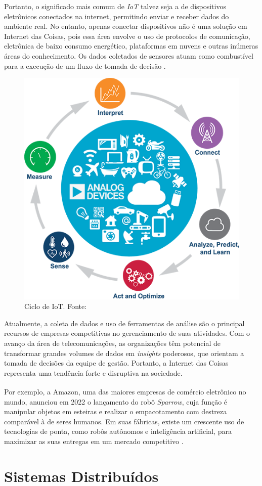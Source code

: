 Portanto, o significado mais comum de \textit{IoT} talvez seja a de dispositivos eletrônicos conectados na internet, permitindo enviar e receber dados do ambiente real. No entanto, apenas conectar dispositivos não é uma solução em Internet das Coisas, pois essa área envolve o uso de protocolos de comunicação, eletrônica de baixo consumo energético, plataformas em nuvens e outras inúmeras áreas do conhecimento. Os dados coletados de sensores atuam como combustível para a execução de um fluxo de tomada de decisão \cite{iot-cycle}. 

\begin{figure}[ht]
    \centering
    \includegraphics[width=.45\textwidth]{img/iot-cycle.png}
    \caption{Ciclo de IoT. Fonte:\cite{iot-cycle}}\label{figIoTCycle}
\end{figure}

Atualmente, a coleta de dados e uso de ferramentas de análise são o principal recursos de empresas competitivas no gerenciamento de suas atividades. Com o avanço da área de telecomunicações, as organizações têm potencial de transformar grandes volumes de dados em \textit{insights} poderosos, que orientam a tomada de decisões da equipe de gestão. Portanto, a Internet das Coisas representa uma tendência forte e disruptiva na sociedade.

Por exemplo, a Amazon\textsuperscript{\textregistered}, uma das maiores empresas de comércio eletrônico no mundo, anunciou em 2022 o lançamento do robô \textit{Sparrow}, cuja função é manipular objetos em esteiras e realizar o empacotamento
com destreza comparável à de seres humanos. Em suas fábricas, existe um crescente uso de tecnologias de ponta, como robôs autônomos e inteligência artificial, para maximizar as suas entregas em um mercado competitivo \cite{amazon-robos}.

\section{Sistemas Distribuídos}

